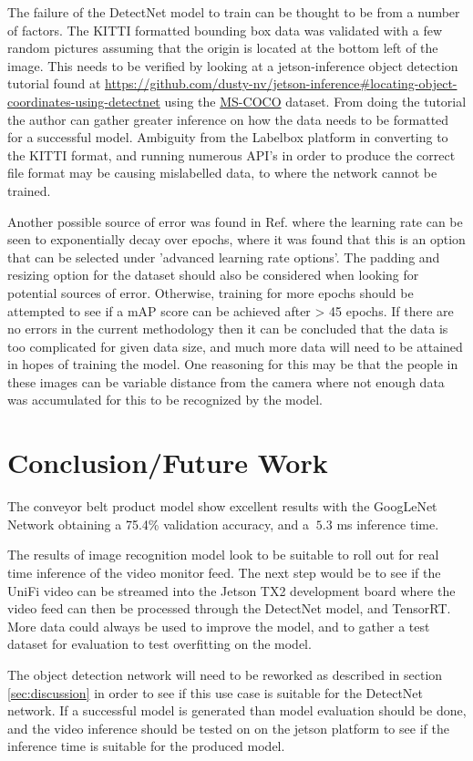 \documentclass[10pt,journal,compsoc]{IEEEtran}
\begin{document}
The failure of the DetectNet model to train can be thought to be from a number of factors. The KITTI formatted bounding box data was validated with a few random pictures assuming that the origin is located at the bottom left of the image. This needs to be verified by looking at a jetson-inference object detection tutorial found at \href{https://github.com/dusty-nv/jetson-inference#locating-object-coordinates-using-detectnet}{https://github.com/dusty-nv/jetson-inference\#locating-object-coordinates-using-detectnet} using the \href{http://cocodataset.org/\#home}{MS-COCO} dataset. From doing the tutorial the author can gather greater inference on how the data needs to be formatted for a successful model. Ambiguity from the Labelbox platform in converting to the KITTI format, and running numerous API's in order to produce the correct file format may be causing mislabelled data, to where the network cannot be trained.

Another possible source of error was found in Ref. \cite{DNwDIGITS} where the learning rate can be seen to exponentially decay over epochs, where it was found that this is an option that can be selected under 'advanced learning rate options'. The padding and resizing option for the dataset should also be considered when looking for potential sources of error. Otherwise, training for more epochs should be attempted to see if a mAP score can be achieved after > 45 epochs. If there are no errors in the current methodology then it can be concluded that the data is too complicated for given data size, and much more data will need to be attained in hopes of training the model. One reasoning for this may be that the people in these images can be variable distance from the camera where not enough data was accumulated for this to be recognized by the model.

\section{Conclusion/Future Work}
\label{sec:conclusion}

The conveyor belt product model show excellent results with the GoogLeNet Network obtaining a 75.4\% validation accuracy, and a $~5.3$ ms inference time.

The results of image recognition model look to be suitable to roll out for real time inference of the video monitor feed. The next step would be to see if the UniFi video can be streamed into the Jetson TX2 development board where the video feed can then be processed through the DetectNet model, and TensorRT. More data could always be used to improve the model, and to gather a test dataset for evaluation to test overfitting on the model.

The object detection network will need to be reworked as described in section \ref{sec:discussion} in order to see if this use case is suitable for the DetectNet network. If a successful model is generated than model evaluation should be done, and the video inference should be tested on on the jetson platform to see if the inference time is suitable for the produced model.




\end{document}
